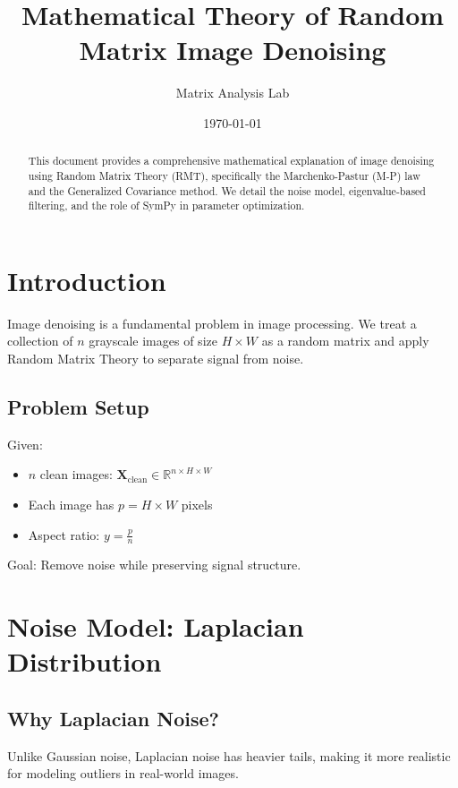 \documentclass[12pt,a4paper]{article}
\title{Mathematical Theory of Random Matrix Image Denoising}
\author{Matrix Analysis Lab}
\date{\today}
\begin{document}
\maketitle

\begin{abstract}
This document provides a comprehensive mathematical explanation of image denoising using Random Matrix Theory (RMT), specifically the Marchenko-Pastur (M-P) law and the Generalized Covariance method. We detail the noise model, eigenvalue-based filtering, and the role of SymPy in parameter optimization.
\end{abstract}

\tableofcontents
\newpage

\section{Introduction}

Image denoising is a fundamental problem in image processing. We treat a collection of $n$ grayscale images of size $H \times W$ as a random matrix and apply Random Matrix Theory to separate signal from noise.

\subsection{Problem Setup}

Given:
\begin{itemize}
    \item $n$ clean images: $\mathbf{X}_{\text{clean}} \in \mathbb{R}^{n \times H \times W}$
    \item Each image has $p = H \times W$ pixels
    \item Aspect ratio: $y = \frac{p}{n}$
\end{itemize}

Goal: Remove noise while preserving signal structure.

\section{Noise Model: Laplacian Distribution}

\subsection{Why Laplacian Noise?}

Unlike Gaussian noise, Laplacian noise has heavier tails, making it more realistic for modeling outliers in real-world images.
\end{document}
